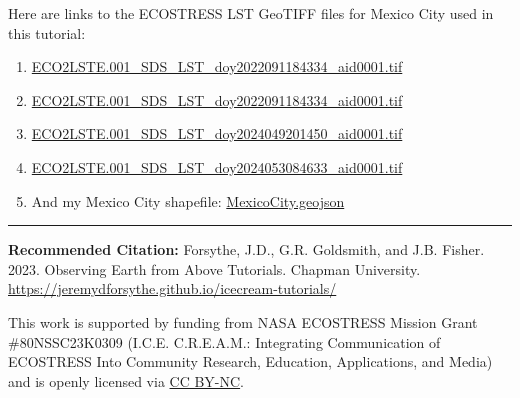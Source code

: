 \documentclass[oneside,a4paper,11pt,explicit]{book}
\begin{document}
\begin{tcolorbox}[colback=yellow!5!white,title=\textbf{Datafiles}]
	\large
	Here are links to the ECOSTRESS LST GeoTIFF files for Mexico City used in this tutorial:

    \begin{enumerate}
        \item \href{https://jeremydforsythe.github.io/icecream-tutorials/Tutorial13_RasterCalculator/ECO2LSTE.001_SDS_LST_doy2022091184334_aid0001.tif}{\small ECO2LSTE.001\_SDS\_LST\_doy2022091184334\_aid0001.tif}
        \item \href{https://jeremydforsythe.github.io/icecream-tutorials/Tutorial13_RasterCalculator/ECO2LSTE.001_SDS_LST_doy2022091184334_aid0001.tif}{\small ECO2LSTE.001\_SDS\_LST\_doy2022091184334\_aid0001.tif}
        \item \href{https://jeremydforsythe.github.io/icecream-tutorials/Tutorial11_RasterCalculator/ECO2LSTE.001_SDS_LST_doy2024049201450_aid0001.tif}{\small ECO2LSTE.001\_SDS\_LST\_doy2024049201450\_aid0001.tif}
        \item \href{https://jeremydforsythe.github.io/icecream-tutorials/Tutorial11_RasterCalculator/ECO2LSTE.001_SDS_LST_doy2024053084633_aid0001.tif}{\small ECO2LSTE.001\_SDS\_LST\_doy2024053084633\_aid0001.tif}
        \item And my Mexico City shapefile: \href{https://jeremydforsythe.github.io/icecream-tutorials/Tutorial11_ESI/MexicoCityPolygon/MexicoCity.geojson}{\small MexicoCity.geojson}
    \end{enumerate}
\end{tcolorbox}

\vfill

\hrule

\vspace{1em}

\small \textbf{Recommended Citation:} Forsythe, J.D., G.R. Goldsmith, and J.B. Fisher. 2023. Observing Earth from Above Tutorials. Chapman University. \url{https://jeremydforsythe.github.io/icecream-tutorials/}

\vspace{1em}

This work is supported by funding from NASA ECOSTRESS Mission Grant \#80NSSC23K0309 (I.C.E. C.R.E.A.M.: Integrating Communication of ECOSTRESS Into Community Research, Education, Applications, and Media) and is openly licensed via \href{https://creativecommons.org/licenses/by-nc/4.0/}{CC BY-NC}.
\end{document}
